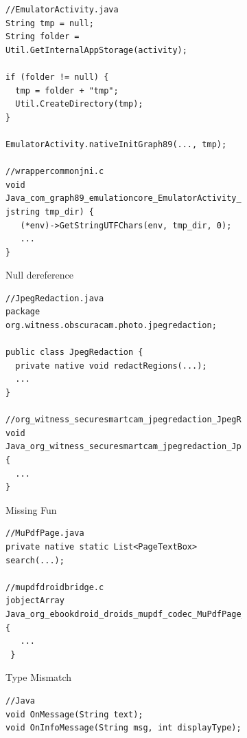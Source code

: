 \begin{figure}[t]
  \centering
  \vspace{2mm}
  \begin{subfigure}[t]{0.5\textwidth}
    \begin{lstlisting}[style=cpp,xleftmargin=2.5em]
//EmulatorActivity.java
String tmp = null;
String folder = Util.GetInternalAppStorage(activity);

if (folder != null) {
  tmp = folder + "tmp";
  Util.CreateDirectory(tmp);
}

EmulatorActivity.nativeInitGraph89(..., tmp);

//wrappercommonjni.c
void Java_com_graph89_emulationcore_EmulatorActivity_nativeInitGraph89(..., jstring tmp_dir) {
   (*env)->GetStringUTFChars(env, tmp_dir, 0);
   ...
}
    \end{lstlisting}
    \vspace*{-.5em}
    \caption{Null dereference}
    \label{fig:bug1}
  \end{subfigure}
  \begin{subfigure}[t]{0.5\textwidth}
    \begin{lstlisting}[style=cpp,xleftmargin=2.5em]
//JpegRedaction.java
package org.witness.obscuracam.photo.jpegredaction;

public class JpegRedaction {
  private native void redactRegions(...);
  ...
}

//org_witness_securesmartcam_jpegredaction_JpegRedaction.cpp
void Java_org_witness_securesmartcam_jpegredaction_JpegRedaction_redactRegions(...) {
  ...
}
    \end{lstlisting}
    \vspace*{-.5em}
    \caption{Missing Fun}
    \label{fig:bug2}
  \end{subfigure}
  \begin{subfigure}[t]{0.5\textwidth}
    \begin{lstlisting}[style=cpp,xleftmargin=2.5em]
//MuPdfPage.java
private native static List<PageTextBox> search(...);

//mupdfdroidbridge.c
jobjectArray Java_org_ebookdroid_droids_mupdf_codec_MuPdfPage_search(...){
   ...
 }
    \end{lstlisting}
    \vspace*{-.5em}
    \caption{Type Mismatch}
    \label{fig:bug3}
  \end{subfigure}
  \begin{subfigure}[t]{0.5\textwidth}
    \begin{lstlisting}[style=cpp,xleftmargin=2.5em]
//Java
void OnMessage(String text);
void OnInfoMessage(String msg, int displayType);



\end{lstlisting}
\end{subfigure}
\end{figure}
